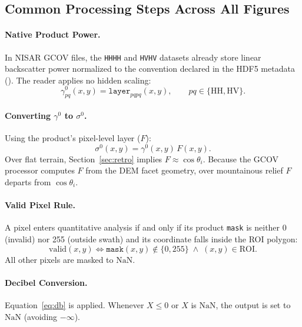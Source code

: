 \documentclass[11pt,a4paper]{article}
\newcommand{\gz}{\ensuremath{\gamma^{0}}}
\newcommand{\sz}{\ensuremath{\sigma^{0}}}
\begin{document}
\subsection{Common Processing Steps Across All Figures}

\paragraph{Native Product Power.} In NISAR GCOV files, the \texttt{HHHH} and \texttt{HVHV} datasets already store linear backscatter power normalized to the convention declared in the HDF5 metadata (). The reader applies no hidden scaling:
\begin{equation}
  \gamma^0_{pq}(x,y) = \texttt{layer}_{pqpq}(x,y), \qquad pq \in \{\text{HH}, \text{HV}\}.
\end{equation}

\paragraph{Converting \gz{} to \sz.} Using the product's pixel-level  layer ($F$):
\begin{equation}
  \sigma^0(x,y) = \gamma^0(x,y)\, F(x,y).
  \label{eq:gamma-sigma}
\end{equation}
Over flat terrain, Section~\ref{sec:retro} implies $F \approx \cos\theta_i$. Because the GCOV processor computes $F$ from the DEM facet geometry, over mountainous relief $F$ departs from $\cos\theta_i$.

\paragraph{Valid Pixel Rule.} A pixel enters quantitative analysis if and only if its product \texttt{mask} is neither 0 (invalid) nor 255 (outside swath) and its coordinate falls inside the ROI polygon:
\begin{equation}
  \text{valid}(x,y) \iff \texttt{mask}(x,y) \notin \{0, 255\} \;\wedge\; (x,y) \in \text{ROI}.
\end{equation}
All other pixels are masked to $\mathrm{NaN}$.

\paragraph{Decibel Conversion.} Equation~\eqref{eq:db} is applied. Whenever $X \le 0$ or $X$ is $\mathrm{NaN}$, the output is set to $\mathrm{NaN}$ (avoiding $-\infty$).
\end{document}
